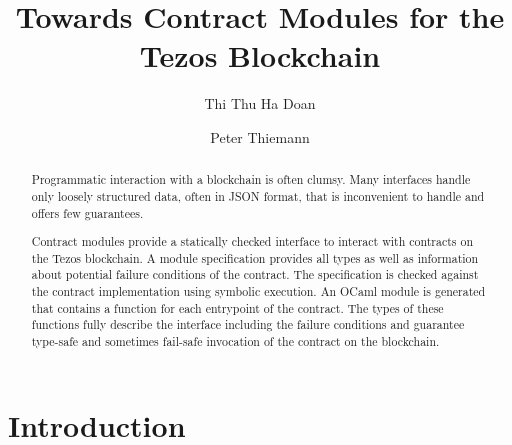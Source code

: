\documentclass[a4paper,USenglish,american,cleveref, autoref, thm-restate]{oasics-v2021}
\title{Towards Contract Modules for the Tezos Blockchain} %
\author{Thi Thu Ha Doan}{University of Freiburg, Germany}{doanha@cs.uni-freiburg.de}{https://orcid.org/0000-0002-1825-0097}{(Optional) author-specific funding acknowledgements}%
\author{Peter Thiemann}{University of Freiburg, Germany}{thiemann@acm.org}{[orcid]}{[funding]}
\begin{document}
\maketitle

\begin{abstract}
  Programmatic interaction with a blockchain is often clumsy.
  Many interfaces handle only loosely structured data, often in JSON
  format, that is inconvenient to handle and offers few guarantees.

  Contract modules provide a statically checked interface to interact
  with contracts on the Tezos blockchain. A module specification
  provides all types as well as information about potential failure
  conditions of the contract. The specification is checked against the
  contract implementation using symbolic execution. An OCaml module is
  generated that contains a function for each entrypoint of the
  contract. The types of these functions fully describe the interface
  including the failure conditions and guarantee type-safe and
  sometimes fail-safe invocation of the contract on the blockchain.
\end{abstract}

\section{Introduction}
\label{sec:introduction}





\end{document}
